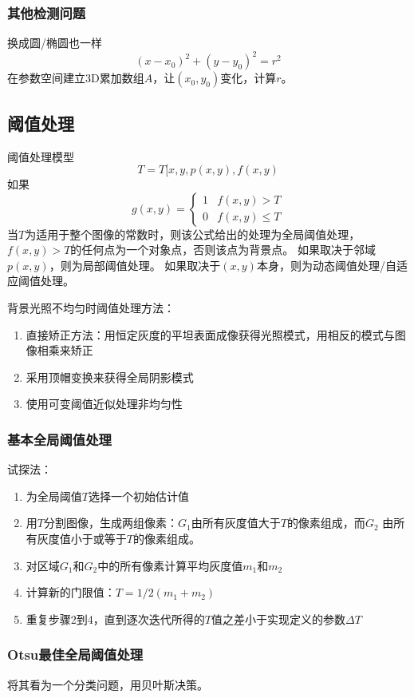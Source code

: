 \subsubsection{其他检测问题}
换成圆/椭圆也一样
\[(x-x_0)^2+(y-y_0)^2=r^2\]
在参数空间建立3D累加数组$A$，让$(x_0,y_0)$变化，计算$r$。


\subsection{阈值处理}
阈值处理模型
\[T=T[x,y,p(x,y),f(x,y)\]
如果
\[g(x,y)=\begin{cases}
1 & f(x,y)>T\\
0 & f(x,y)\leq T
\end{cases}\]
当$T$为适用于整个图像的常数时，则该公式给出的处理为全局阈值处理，$f(x,y)>T$的任何点为一个对象点，否则该点为背景点。
如果取决于邻域$p(x,y)$，则为局部阈值处理。
如果取决于$(x,y)$本身，则为动态阈值处理/自适应阈值处理。

背景光照不均匀时阈值处理方法：
\begin{enumerate}
	\item 直接矫正方法：用恒定灰度的平坦表面成像获得光照模式，用相反的模式与图像相乘来矫正
	\item 采用顶帽变换来获得全局阴影模式
	\item 使用可变阈值近似处理非均匀性
\end{enumerate}

\subsubsection{基本全局阈值处理}
试探法：
\begin{enumerate}
	\item 为全局阈值$T$选择一个初始估计值
	\item 用$T$分割图像，生成两组像素：$G_1$由所有灰度值大于$T$的像素组成，而$G_2$   由所有灰度值小于或等于$T$的像素组成。
	\item 对区域$G_1$和$G_2$中的所有像素计算平均灰度值$m_1$和$m_2$
	\item 计算新的门限值：$T=1/2(m_1+m_2)$
	\item 重复步骤2到4，直到逐次迭代所得的$T$值之差小于实现定义的参数$\Delta T$
\end{enumerate}

\subsubsection{Otsu最佳全局阈值处理}
将其看为一个分类问题，用贝叶斯决策。

